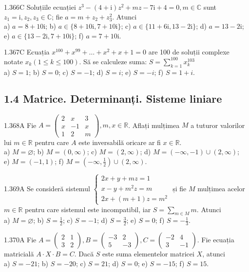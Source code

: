 \documentclass[11pt]{article}
\begin{document}
1.366C Soluțiile ecuației $z^{3}-(4+\mathrm{i}) z^{2}+m z-7 \mathrm{i}+4=0, m \in \mathbb{C}$ sunt $z_{1}=\mathrm{i}, z_{2}, z_{3} \in \mathbb{C}$; fie $a=m+z_{2}+z_{3}^{2}$. Atunci\\ a) $a=8+10 \mathrm{i}$; b) $a \in\{8+10 \mathrm{i}, 7+10 \mathrm{i}\}$; c) $a \in\{11+6 \mathrm{i}, 13-2 \mathrm{i}\}$; d) $a=13-2 \mathrm{i}$; e) $a \in\{13-2 \mathrm{i}, 7+10 \mathrm{i}\}$; f) $a=7+10 \mathrm{i}$.

1.367C Ecuația $x^{100}+x^{99}+\ldots+x^{2}+x+1=0$ are 100 de soluții complexe notate $x_{k}(1 \leq k \leq 100)$. Să se calculeze suma: $S=\sum_{k=1}^{100} x_{k}^{103}$\\ a) $S=1$; b) $S=0$; c) $S=-1$; d) $S=i$; e) $S=-i$; f) $S=1+i$.

\subsection*{1.4 Matrice. Determinanți. Sisteme liniare}
1.368A Fie $A=\left(\begin{array}{ccc}2 & x & 3 \\ x & -1 & x \\ 1 & 2 & m\end{array}\right), m, x \in \mathbb{R}$. Aflați mulțimea $M$ a tuturor valorilor lui $m \in \mathbb{R}$ pentru care $A$ este inversabilă oricare ar fi $x \in \mathbb{R}$.\\ a) $M=\varnothing$; b) $M=(0, \infty)$; c) $M=(2, \infty)$; d) $M=(-\infty,-1) \cup(2, \infty)$;\\ e) $M=(-1,1)$; f) $M=\left(-\infty, \frac{1}{2}\right) \cup(2, \infty)$.

1.369A Se consideră sistemul $\left\{\begin{array}{l}2 x+y+m z=1 \\ x-y+m^{2} z=m \\ 2 x+(m+1) z=m^{2}\end{array}\right.$ și fie $M$ mulțimea acelor $m \in \mathbb{R}$ pentru care sistemul este incompatibil, iar $S=\sum_{m \in M} m$. Atunci\\ a) $M=\varnothing$; b) $S=\frac{1}{2}$; c) $S=-1$; d) $S=\frac{3}{2}$; e) $S=0$; f) $S=-\frac{1}{3}$.

1.370A Fie $A=\left(\begin{array}{ll}2 & 1 \\ 3 & 2\end{array}\right), B=\left(\begin{array}{cc}-3 & 2 \\ 5 & -3\end{array}\right), C=\left(\begin{array}{cc}-2 & 4 \\ 3 & -1\end{array}\right)$. Fie ecuația matricială $A \cdot X \cdot B=C$. Dacă $S$ este suma elementelor matricei $X$, atunci\\ a) $S=-21$; b) $S=-20$; c) $S=21$; d) $S=0$; e) $S=-15$; f) $S=15$.
\end{document}
